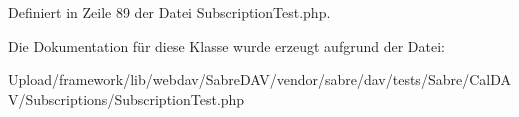 Definiert in Zeile 89 der Datei Subscription\+Test.\+php.



Die Dokumentation für diese Klasse wurde erzeugt aufgrund der Datei\+:\begin{DoxyCompactItemize}
\item 
Upload/framework/lib/webdav/\+Sabre\+D\+A\+V/vendor/sabre/dav/tests/\+Sabre/\+Cal\+D\+A\+V/\+Subscriptions/Subscription\+Test.\+php\end{DoxyCompactItemize}
